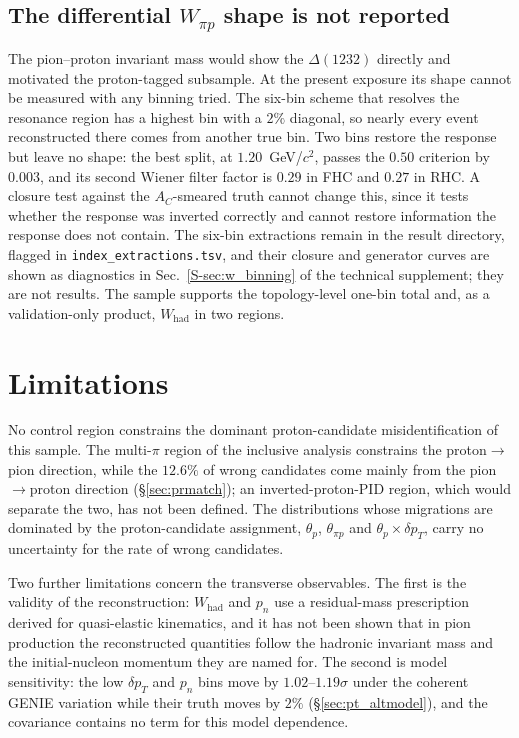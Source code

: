 \documentclass[11pt,a4paper]{article}
\newcommand{\suppref}[2]{#1~\ref{S-#2} of the technical supplement}
\begin{document}
\subsection{The differential \texorpdfstring{$W_{\pi p}$}{W pi p} shape is not reported}
\label{sec:pt_wpip_withdrawn}

The pion--proton invariant mass would show the $\Delta(1232)$ directly and motivated the
proton-tagged subsample. At the present exposure its shape cannot be measured with any binning
tried. The six-bin scheme that resolves the resonance region has a highest bin with a $2\%$
diagonal, so nearly every event reconstructed there comes from another true bin. Two bins restore
the response but leave no shape: the best split, at $1.20$~GeV/$c^2$, passes the $0.50$ criterion by
$0.003$, and its second Wiener filter factor is $0.29$ in FHC and $0.27$ in RHC. A closure test
against the $A_C$-smeared truth cannot change this, since it tests whether the response was inverted
correctly and cannot restore information the response does not contain. The six-bin extractions
remain in the result directory, flagged in \texttt{index\_extractions.tsv}, and their closure and
generator curves are shown as diagnostics in \suppref{Sec.}{sec:w_binning}; they are not results.
The sample supports the topology-level one-bin total and, as a validation-only product,
$W_\mathrm{had}$ in two regions.

\section{Limitations}
\label{sec:pt_limitations}

No control region constrains the dominant proton-candidate misidentification of this sample. The
multi-$\pi$ region of the inclusive analysis constrains the proton$\to$pion direction, while the
$12.6\%$ of wrong candidates come mainly from the pion$\to$proton direction (\S\ref{sec:prmatch}); an
inverted-proton-PID region, which would separate the two, has not been defined. The distributions whose
migrations are dominated by the proton-candidate assignment, $\theta_p$, $\theta_{\pi p}$ and
$\theta_p\times\delta p_T$, carry no uncertainty for the rate of wrong candidates.

Two further limitations concern the transverse observables. The first is the validity of the
reconstruction: $W_\mathrm{had}$ and $p_n$ use a residual-mass prescription derived for quasi-elastic
kinematics, and it has not been shown that in pion production the reconstructed quantities follow the
hadronic invariant mass and the initial-nucleon momentum they are named for. The second is model
sensitivity: the low $\delta p_T$ and $p_n$ bins move by $1.02$--$1.19\sigma$ under the coherent GENIE
variation while their truth moves by $2\%$ (\S\ref{sec:pt_altmodel}), and the covariance contains no
term for this model dependence.
\end{document}

